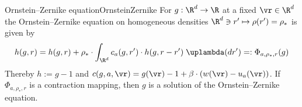\begin{mdef}{Ornstein–Zernike equation}{OrnsteinZernike}
    For $g:\R^d\to\R$ at a fixed $\vr\in\R^d$ the Ornstein–Zernike equation on homogeneous densities $\R^d\ni r'\mapsto \rho(r') = \rho_*$ is given by
    \[
        h(g,r) = h(g,r) + \rho_*\cdot \int_{\R^d}c_a(g,r')\cdot h(g,r - r')\;\uplambda(dr') =: \Phi_{a,\rho_*,r}(g)
    \]
    Thereby $h:=g-1$ and $c(g,a,\vr) = g(\vr) - 1 + \beta\cdot (w(\vr) - u_a(\vr))$. If $\Phi_{a,\rho_*,r}$ is a contraction mapping, then $g$ is a solution of the Ornstein–Zernike equation.
\end{mdef}
    